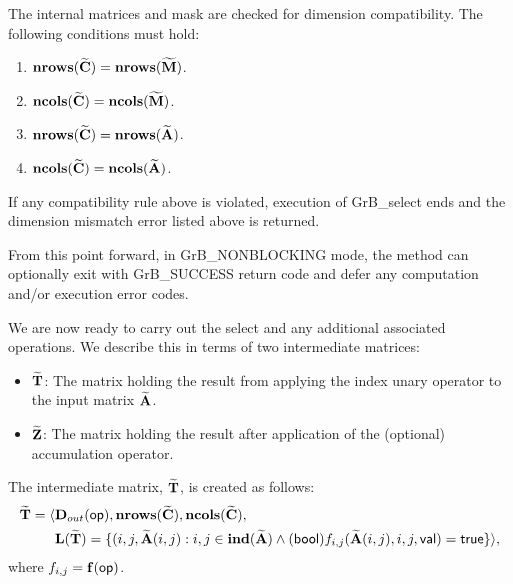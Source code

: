 The internal matrices and mask are checked for dimension compatibility. 
The following conditions must hold:
\begin{enumerate}
    \item $\bold{nrows}({\bf \widetilde{C}}) = \bold{nrows}({\bf \widetilde{M}})$.

    \item $\bold{ncols}({\bf \widetilde{C}}) = \bold{ncols}({\bf \widetilde{M}})$.

    \item $\bold{nrows}({\bf \widetilde{C}}) = \bold{nrows}({\bf \widetilde{A}})$.

    \item $\bold{ncols}({\bf \widetilde{C}}) = \bold{ncols}({\bf \widetilde{A}})$.
\end{enumerate}
If any compatibility rule above is violated, execution of {\sf GrB\_select} ends and 
the dimension mismatch error listed above is returned.

From this point forward, in {\sf GrB\_NONBLOCKING} mode, the method can optionally exit
with {\sf GrB\_SUCCESS} return code and defer any computation and/or execution error codes.

We are now ready to carry out the select and any additional 
associated operations.  We describe this in terms of two intermediate matrices:
\begin{itemize}
    \item ${\bf \widetilde{T}}$: The matrix holding the result from applying the index unary operator to the input matrix
    ${\bf \widetilde{A}}$.

    \item ${\bf \widetilde{Z}}$: The matrix holding the result after 
    application of the (optional) accumulation operator.
\end{itemize}

{\color{red}
The intermediate matrix, ${\bf \widetilde{T}}$, is created as follows:
\[
\begin{aligned}
{\bf \widetilde{T}} = \langle & \mbox{$\mathbf{D}_{out}$}({\sf op}),
                           \bold{nrows}({\bf \widetilde{C}}), 
                           \bold{ncols}({\bf \widetilde{C}}), \\
						  & \bold{L}({\bf \widetilde{T}}) =
    \{(i,j,{\bf \widetilde{A}}(i,j) : {i,j} \in \bold{ind}({\bf \widetilde{A}}) 
	\wedge
({\sf bool})f_{i,j}({\bf \widetilde{A}}(i,j),i,j,{\sf val}) = {\sf true} \} \rangle,
\end{aligned}
\]
where $f_{i,j} = \mathbf{f}({\sf op})$.
}




